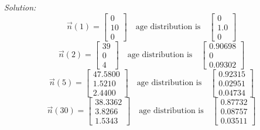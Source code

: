 \documentclass[11pt]{amsart}
\renewcommand{\(}{\left(}
\renewcommand{\)}{\right)}
\renewcommand{\[}{\left[}
\renewcommand{\]}{\right]}
\theoremstyle{definition}
\theoremstyle{remark}
\newcommand{\sol}{\smallskip \emph{Solution:  }}
\begin{document}
\sol 
$$
\vec n(1) = \[\begin{matrix} 0 \\10 \\ 0\end{matrix}\]\quad \text{age distribution is}\quad
\[\begin{matrix} 0 \\1.0 \\0 \end{matrix}\]
$$
$$
\vec n(2) = \[\begin{matrix} 39 \\0 \\ 4\end{matrix}\]\quad \text{age distribution is}\quad
\[\begin{matrix} 0.90698 \\ 0\\ 0.09302\end{matrix}\]
$$
$$
\vec n(5) = \[\begin{matrix} 47.5800 \\1.5210 \\ 2.4400\end{matrix}\]\quad \text{age distribution is}\quad
\[\begin{matrix} 0.92315 \\0.02951 \\0.04734 \end{matrix}\]
$$
$$
\vec n(30) = \[\begin{matrix} 38.3362 \\3.8266 \\ 1.5343\end{matrix}\]\quad \text{age distribution is}\quad
\[\begin{matrix} 0.87732 \\ 0.08757\\0.03511 \end{matrix}\]
$$
\end{document}
